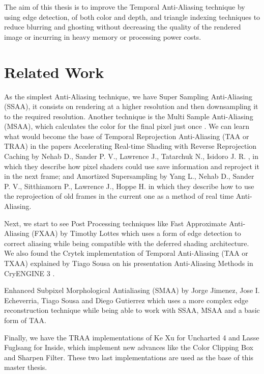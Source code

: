 \documentclass{cslthse-msc}
\begin{document}
The aim of this thesis is to improve the Temporal Anti-Aliasing technique by using edge detection, of both color and depth, and triangle indexing techniques to reduce blurring and ghosting without decreasing the quality of the rendered image or incurring in heavy memory or processing power costs.  


\section{Related Work}
As the simplest Anti-Aliasing technique, we have Super Sampling Anti-Aliasing (SSAA), it consists on rendering at a higher resolution and then downsampling it to the required resolution. Another technique is the Multi Sample Anti-Aliasing (MSAA), which calculates the color for the final pixel just once \cite{Doggett2017EDAN35}.  We can learn what would become the base of Temporal Reprojection Anti-Aliasing (TAA or TRAA) in the papers Accelerating Real-time Shading with Reverse Reprojection Caching  by Nehab D., Sander P. V., Lawrence J., Tatarchuk N., Isidoro J. R. \cite{Nehab2007}, in which they describe how pixel shaders could use save information and reproject it in the next frame; and Amortized Supersampling by Yang L., Nehab D., Sander P. V., Sitthiamorn P., Lawrence J., Hoppe H. \cite{Yang2009} in which they describe how to use the reprojection of old frames in the current one as a method of real time Anti-Aliasing.

Next, we start to see Post Processing techniques like Fast Approximate Anti-Aliasing (FXAA) by Timothy Lottes \cite{Lottes2009} which uses a form of edge detection to correct aliasing while being compatible with the deferred shading architecture. We also found the Crytek implementation of Temporal Anti-Aliasing (TAA or TXAA) explained by Tiago Sousa on his presentation Anti-Aliasing Methods in CryENGINE 3 \cite{JIMENEZ2011_SIGGRAPH11}.

Enhanced Subpixel Morphological Antialiasing (SMAA) by Jorge Jimenez, Jose I. Echeverria, Tiago Sousa and Diego Gutierrez \cite{Jimenez2012} which uses a more complex edge reconstruction technique while being able to work with SSAA, MSAA and a basic form of TAA.
 
Finally, we have the TRAA implementations of Ke Xu for Uncharted 4 and Lasse Fuglsang for Inside, which implement new advances like the Color Clipping Box and Sharpen Filter. These two last implementations are used as the base of this master thesis.  \cite{Fuglsand2016, XU2016}
\end{document}
